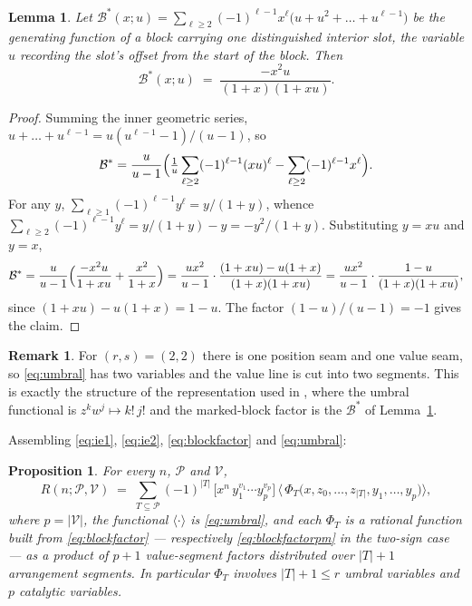 \documentclass[11pt]{article}
\newtheorem{proposition}[theorem]{Proposition}
\newtheorem{lemma}[theorem]{Lemma}
\theoremstyle{definition}
\newtheorem{remark}[theorem]{Remark}
\begin{document}
\begin{lemma}\label{lem:marked}
Let $\mathcal{B}^{\ast}(x;u)=\sum_{\ell\ge 2}(-1)^{\ell-1}x^{\ell}
\bigl(u+u^{2}+\dots+u^{\ell-1}\bigr)$ be the generating function of a block
carrying one distinguished interior slot, the variable $u$ recording the slot's
offset from the start of the block. Then
\[
  \mathcal{B}^{\ast}(x;u)\;=\;\frac{-x^{2}u}{(1+x)(1+xu)} .
\]
\end{lemma}

\begin{proof}
Summing the inner geometric series,
$u+\dots+u^{\ell-1}=u(u^{\ell-1}-1)/(u-1)$, so
\[
  \mathcal{B}^{\ast}
  =\frac{u}{u-1}\Bigl(\tfrac1u\sum_{\ell\ge2}(-1)^{\ell-1}(xu)^{\ell}
   -\sum_{\ell\ge2}(-1)^{\ell-1}x^{\ell}\Bigr).
\]
For any $y$, $\sum_{\ell\ge1}(-1)^{\ell-1}y^{\ell}=y/(1+y)$, whence
$\sum_{\ell\ge2}(-1)^{\ell-1}y^{\ell}=y/(1+y)-y=-y^{2}/(1+y)$. Substituting
$y=xu$ and $y=x$,
\[
  \mathcal{B}^{\ast}
  =\frac{u}{u-1}\Bigl(\frac{-x^{2}u}{1+xu}+\frac{x^{2}}{1+x}\Bigr)
  =\frac{ux^{2}}{u-1}\cdot\frac{(1+xu)-u(1+x)}{(1+x)(1+xu)}
  =\frac{ux^{2}}{u-1}\cdot\frac{1-u}{(1+x)(1+xu)},
\]
since $(1+xu)-u(1+x)=1-u$. The factor $(1-u)/(u-1)=-1$ gives the claim.
\end{proof}

\begin{remark}
For $(r,s)=(2,2)$ there is one position seam and one value seam, so
\eqref{eq:umbral} has two variables and the value line is cut into two
segments. This is exactly the structure of the representation used in
\cite{PadhiA22}, where the umbral functional is $z^{k}w^{j}\mapsto k!\,j!$ and
the marked-block factor is the $\mathcal{B}^{\ast}$ of
Lemma~\ref{lem:marked}.
\end{remark}

Assembling \eqref{eq:ie1}, \eqref{eq:ie2}, \eqref{eq:blockfactor} and
\eqref{eq:umbral}:

\begin{proposition}\label{prop:rep}
For every $n$, $\mathcal{P}$ and $\mathcal{V}$,
\begin{equation}\label{eq:rep}
  R(n;\mathcal{P},\mathcal{V})
  \;=\;
  \sum_{T\subseteq\mathcal{P}}(-1)^{|T|}\,
  \bigl[x^{n}\,y_1^{v_1}\cdots y_p^{v_p}\bigr]\,
  \bigl\langle\,\Phi_T\bigl(x,z_0,\dots,z_{|T|},y_1,\dots,y_p\bigr)\bigr\rangle ,
\end{equation}
where $p=|\mathcal{V}|$, the functional $\langle\cdot\rangle$ is
\eqref{eq:umbral}, and each $\Phi_T$ is a rational function built from
\eqref{eq:blockfactor} --- respectively \eqref{eq:blockfactorpm} in the
two-sign case --- as a product of $p+1$ value-segment factors distributed over
$|T|+1$ arrangement segments. In particular $\Phi_T$ involves
$|T|+1\le r$ umbral variables and $p$ catalytic variables.
\end{proposition}
\end{document}
